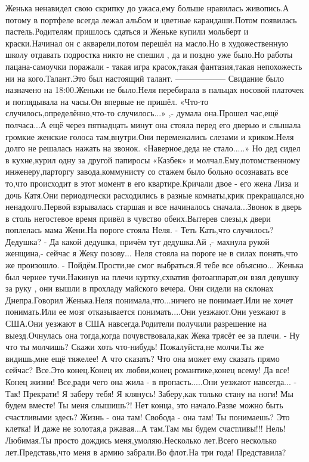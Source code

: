 Женька ненавидел свою скрипку до ужаса,ему больше нравилась живопись.А потому в портфеле всегда лежал альбом и цветные карандаши.Потом появилась пастель.Родителям пришлось сдаться и Женьке купили мольберт и краски.Начинал он с акварели,потом перешёл на масло.Но в художественную школу отдавать подростка никто не спешил , да и поздно уже было.Но работы пацана-самоучки поражали - такая игра красок,такая фантазия,такая непохожесть ни на кого.Талант.Это был настоящий талант.
——————
Свидание было назначено на 18:00.Женьки не было.Неля перебирала в пальцах носовой платочек и поглядывала на часы.Он впервые не пришёл.
«Что-то случилось,определённо,что-то случилось...» ,- думала она.Прошел час,ещё полчаса...А ещё через пятнадцать минут она стояла перед его дверью и слышала громкие женские голоса там,внутри.Они перемежались слезами и криком.Неля долго не решалась нажать на звонок. «Наверное,деда не стало.....» 
Но дед сидел в кухне,курил одну за другой папиросы «Казбек» и молчал.Ему,потомственному инженеру,парторгу завода,коммунисту со стажем было больно осознавать все то,что происходит в этот момент в его квартире.Кричали двое - его жена Лиза и дочь Катя.Они периодически расходились в разные комнаты,крик прекращался,но ненадолго.Первой взрывалась старшая и все начиналось сначала...Звонок в дверь в столь негостевое время привёл в чувство обеих.Вытерев слезы,к двери поплелась мама Жени.На пороге стояла Неля.
- Теть Кать,что случилось? Дедушка?
- Да какой дедушка, причём тут дедушка.Ай ,- махнула рукой женщина,- сейчас я Жеку позову...
Неля стояла на пороге не в силах понять,что же произошло.
- Пойдём.Прости,не смог выбраться.Я тебе все объясню...
Женька был чернее тучи.Накинув на плечи куртку,схватив фотоаппарат,он взял девушку за руку , они вышли в прохладу майского вечера.
Они сидели на склонах Днепра.Говорил Женька.Неля понимала,что...ничего не понимает.Или не хочет понимать.Или ее мозг отказывается понимать....Они уезжают.Они уезжают в США.Они уезжают в США навсегда.Родители получили разрешение на выезд.Очнулась она тогда,когда почувствовала,как Жека трясёт ее за плечи.
- Ну что ты молчишь? Скажи хоть что-нибудь! Пожалуйста,не молчи.Ты же видишь,мне ещё тяжелее! 
А что сказать? Что она может ему сказать прямо сейчас? Все.Это конец.Конец их любви,конец романтике,конец всему! Да все! Конец жизни! Все,ради чего она жила - в пропасть.....Они уезжают навсегда...
- Так! Прекрати! Я заберу тебя! Я клянусь! Заберу,как только стану на ноги! Мы будем вместе! Ты меня слышишь?! Нет конца, это начало.Разве можно быть счастливыми здесь? Жизнь - она там! Свобода - она там! Ты понимаешь? Это клетка! И даже не золотая,а ржавая...А там.Там мы будем счастливы!!! Нель! Любимая.Ты просто дождись меня,умоляю.Несколько лет.Всего несколько лет.Представь,что меня в армию забрали.Во флот.На три года! Представила?
